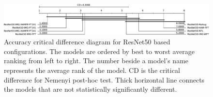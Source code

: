 \begin{figure}[htb!]
	\centering
	\includegraphics[width=\textwidth,keepaspectratio]{images/pretraining/CDRes-cropped.pdf}
	\caption[Accuracy critical difference diagram for ResNet50 based configurations]{Accuracy critical difference diagram for ResNet50 based configurations. The models are ordered by best to worst average ranking from left to right. The number beside a model’s name represents the average rank of the model. CD is the critical difference for Nemenyi post-hoc test. Thick horizontal line connects the models that are not statistically significantly different.}
	\label{fig:CD_ResNet}
\end{figure}

